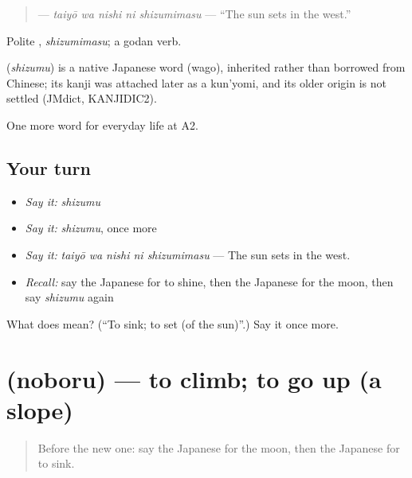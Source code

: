 \begin{quote}
\textbf{  } — \emph{taiyō wa nishi ni shizumimasu} — \textquotedblleft{}The sun sets in the west.\textquotedblright{}
\end{quote}

Polite \textbf{}, \emph{shizumimasu}; a godan verb.

\begin{cousinweb}
\textbf{} (\emph{shizumu}) is a native Japanese word (wago), inherited rather than borrowed from Chinese; its kanji was attached later as a kun'yomi, and its older origin is not settled (JMdict, KANJIDIC2).
\end{cousinweb}

\begin{grammarlens}[title={What you've built}]
One more word for everyday life at A2.
\end{grammarlens}

\subsection*{Your turn}
\begin{itemize}
\raggedright
  \item \emph{Say it:} \emph{shizumu}
  \item \emph{Say it:} \emph{shizumu}, once more
  \item \emph{Say it:} \emph{taiyō wa nishi ni shizumimasu} — The sun sets in the west.
  \item \emph{Recall:} say the Japanese for to shine, then the Japanese for the moon, then say \emph{shizumu} again
\end{itemize}

\begin{tcolorbox}[breakable,colback=teal!4,colframe=teal!35!black,title={Before you move on}]
What does  mean? (\textquotedblleft{}To sink; to set (of the sun)\textquotedblright{}.) Say it once more.
\end{tcolorbox}
\section[\texorpdfstring{\ja{のぼる} (noboru)}{のぼる (noboru)}]{ (noboru) — to climb; to go up (a slope)}

\label{lesson:JA-C213-noboru}



\begin{quote}
Before the new one: say the Japanese for the moon, then the Japanese for to sink.
\end{quote}

